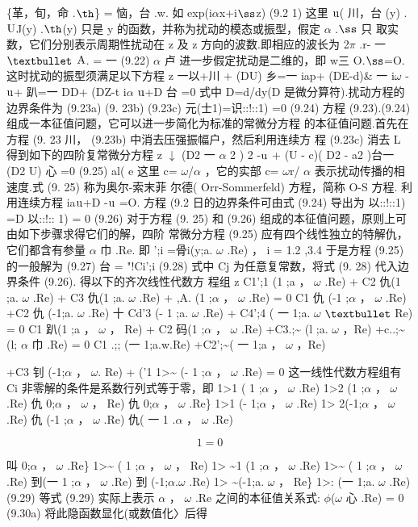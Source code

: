 \{革，旬，命 .${\rm þ}$\} = 恼，台 .w. 如 exp(i$\alpha$x+i${\rm ß}$z) (9.2 1) 这里 ${\rm u}$( 川，台 (y) .${\rm U}$J(y) .${\rm þ}$(y) 只是 y 的函数，并称为扰动的模态或振型，假定 $\alpha$ .${\rm ß}$ 只 取实数，它们分别表示周期性扰动在 z 及 z 方向的波数.即相应的波长为 2$\pi$ .r- 一 ${\rm •}$ ${\rm A}$. = 一 (9.22) $\alpha$ 卢 进一步假定扰动是二维的，即 w三 O.${\rm ß}$=O. 这时扰动的振型须满足以下方程 z 一以+川 + (DU) 乡=一 iap+  (DE-d)\& 一 i$\omega$ -${\rm u}$+ 趴=一 DD+  (DZ-t i$\alpha$ ${\rm u}$+D 台 =0 式中 D=d/dy(D 是微分算符).扰动方程的边界条件为 (9.23a) (9. 23b) (9.23c) 元(士1)=识::!::1) =0 (9.24) 方程 (9.23).(9.24) 组成一本征值问题，它可以进一步简化为标准的常微分方程 的本征值问题.首先在方程 (9. 23 川， (9.23b) 中消去压强振幅户，然后利用连续方 程 (9.23c) 消去 L 得到如下的四阶复常微分方程 z $\downarrow$ (D2 一 $\alpha$ 2 ) 2 -${\rm u}$ + (U - c)( D2 - a2 )台一 (D2 U) 心 =0 (9.25) al( e 这里 c= $\omega$/$\alpha$ ，它的实部 c= $\omega$r/ $\alpha$ 表示扰动传播的相速度.式 (9. 25) 称为奥尔-索末菲 尔德( Orr-Sommerfeld) 方程，简称 O-S 方程. 利用连续方程 ia${\rm u}$+D -${\rm u}$ =O. 方程 (9.2 日的边界条件可由式 (9.24) 导出为 以::!::1) =D 以::!:: 1) = 0 (9.26) 对于方程 (9. 25) 和 (9.26) 组成的本征值问题，原则上可由如下步骤求得它们的解，四阶 常微分方程 (9.25) 应有四个线性独立的特解仇，它们都含有参量 $\alpha$ 巾 .Re. 即 ';i =骨i(y;a. $\omega$ .Re) ， i = 1.2 ,3.4 于是方程 (9.25) 的一般解为 (9.27) 台 = "!Ci';i (9.28) 式中 Cj 为任意复常数，将式 (9. 28) 代入边界条件 (9.26). 得以下的齐次线性代数方 程组 z C1';1 (1 ;a ， $\omega$ .Re) + C2 仇(1 ;a. $\omega$ .Re) + C3 仇(1 ;a. $\omega$ .Re) + ,A. (1 ;$\alpha$ ， $\omega$ .Re) = 0 C1 仇 (-1 ;$\alpha$ ， $\omega$ .Re) +C2 仇 (-1;a. $\omega$ .Re) 十 Cd'3 (- 1 ;a. $\omega$ .Re) + C4';4 ( 一 1;a. $\omega$ ${\rm •}$ Re) = 0 C1 趴(1 ;a ， $\omega$ ， Re) + C2 码(1 ;$\alpha$ ， $\omega$ .Re) +C3.;\textasciitilde{} (l ;a. $\omega$ ，Re) +c..;\textasciitilde{} (l; $\alpha$ 巾 .Re) = 0 C1 .;; (一 1;a.w.Re) +C2';\textasciitilde{}( 一 1;a ， $\omega$ ，Re)

+C3 钊 (-1;$\alpha$ ， $\omega$. Re) + ('1 1>\textasciitilde{} (- 1 ;$\alpha$ ， $\omega$ .Re) = 0 这一线性代数方程组有 Ci 非零解的条件是系数行列式等于零，即 1>1 ( 1 ;$\alpha$ ， $\omega$ .Re) 1>2 (1 ;$\alpha$ ， $\omega$ .Re) 仇 0;$\alpha$ ， $\omega$ ， Re) 仇 0;$\alpha$ ， $\omega$ .Re\} 1>1 (- 1;$\alpha$ ， $\omega$ .Re) 1> 2(-1;$\alpha$ ， $\omega$ .Re) 仇 (-1 ;$\alpha$ ， $\omega$ .Re) 仇( 一 1 .$\alpha$ ， $\omega$ .Re)

\[1=0\]

叫 0;$\alpha$ ， $\omega$ .Re\} 1>\textasciitilde{} ( 1 ;$\alpha$ ， $\omega$ ， Re) 1> \textasciitilde{}1 (1 ;$\alpha$ ， $\omega$ .Re) 1>\textasciitilde{} ( 1 ;$\alpha$ ， $\omega$ .Re) 到(一 1 ;$\alpha$ ， $\omega$ .Re) 到 (-1;$\alpha$.$\omega$ .Re) 1> \textasciitilde{}(-1;a. $\omega$ ， Re\} 1>: (一 1;a. $\omega$ .Re) (9.29) 等式 (9.29) 实际上表示 $\alpha$ ， $\omega$ .Re 之间的本征值关系式: $\phi$($\omega$ 心 .Re) = 0 (9.30a) 将此隐函数显化(或数值化〉后得

